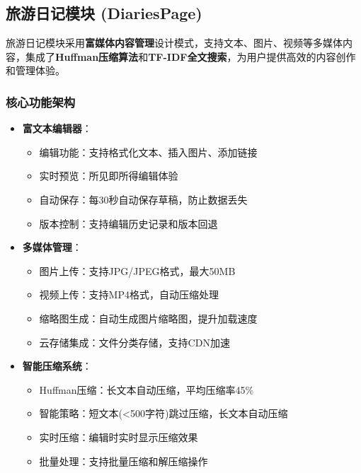 \documentclass[12pt,a4paper]{article}
\begin{document}
\subsection{旅游日记模块 (DiariesPage)}

\begin{designbox}[title={内容管理设计理念}]
旅游日记模块采用\textbf{富媒体内容管理}设计模式，支持文本、图片、视频等多媒体内容，集成了\textbf{Huffman压缩算法}和\textbf{TF-IDF全文搜索}，为用户提供高效的内容创作和管理体验。
\end{designbox}

\subsubsection{核心功能架构}

\begin{itemize}
    \item \textbf{富文本编辑器}：
    \begin{itemize}
        \item 编辑功能：支持格式化文本、插入图片、添加链接
        \item 实时预览：所见即所得编辑体验
        \item 自动保存：每30秒自动保存草稿，防止数据丢失
        \item 版本控制：支持编辑历史记录和版本回退
    \end{itemize}
    
    \item \textbf{多媒体管理}：
    \begin{itemize}
        \item 图片上传：支持JPG/JPEG格式，最大50MB
        \item 视频上传：支持MP4格式，自动压缩处理
        \item 缩略图生成：自动生成图片缩略图，提升加载速度
        \item 云存储集成：文件分类存储，支持CDN加速
    \end{itemize}
    
    \item \textbf{智能压缩系统}：
    \begin{itemize}
        \item Huffman压缩：长文本自动压缩，平均压缩率45\%
        \item 智能策略：短文本(<500字符)跳过压缩，长文本自动压缩
        \item 实时压缩：编辑时实时显示压缩效果
        \item 批量处理：支持批量压缩和解压缩操作
    \end{itemize}
\end{itemize}
\end{document}
